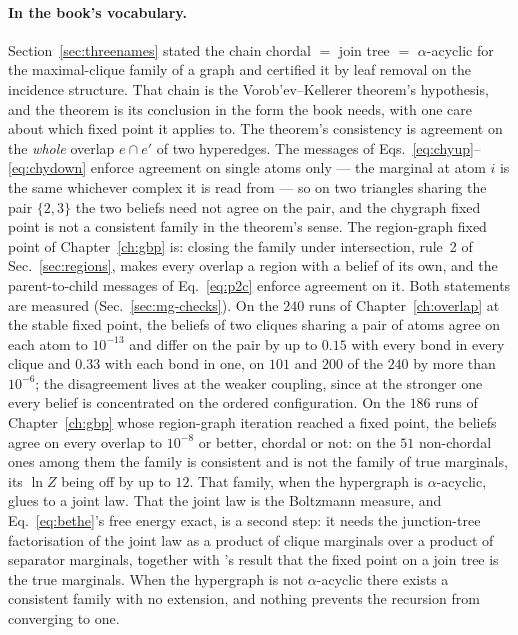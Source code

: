 \paragraph{In the book's vocabulary.} Section~\ref{sec:threenames} stated
the chain chordal $=$ join tree $=$ $\alpha$-acyclic for the maximal-clique
family of a graph and certified it by leaf removal on the incidence
structure. That chain is the Vorob'ev--Kellerer theorem's hypothesis, and
the theorem is its conclusion in the form the book needs, with one care
about which fixed point it applies to. The theorem's consistency is
agreement on the \emph{whole} overlap $e\cap e'$ of two hyperedges. The
messages of Eqs.~\eqref{eq:chyup}--\eqref{eq:chydown} enforce agreement on
single atoms only --- the marginal at atom $i$ is the same whichever
complex it is read from --- so on two triangles sharing the pair
$\{2,3\}$ the two beliefs need not agree on the pair, and the chygraph
fixed point is not a consistent family in the theorem's sense. The
region-graph fixed point of Chapter~\ref{ch:gbp} is: closing the family
under intersection, rule~2 of Sec.~\ref{sec:regions}, makes every overlap a
region with a belief of its own, and the parent-to-child messages of
Eq.~\eqref{eq:p2c} enforce agreement on it. Both statements are measured
(Sec.~\ref{sec:mg-checks}). On the $240$ runs of Chapter~\ref{ch:overlap}
at the stable fixed point, the beliefs of two cliques sharing a pair of
atoms agree on each atom to $10^{-13}$ and differ on the pair by up to
$0.15$ with every bond in every clique and $0.33$ with each bond in one,
on $101$ and $200$ of the $240$ by more than $10^{-6}$; the disagreement
lives at the weaker coupling, since at the stronger one every belief is
concentrated on the ordered configuration. On the $186$ runs of
Chapter~\ref{ch:gbp} whose region-graph iteration reached a fixed point,
the beliefs agree on every overlap to $10^{-8}$ or better, chordal or not:
on the $51$ non-chordal ones among them the family is consistent and is
not the family of true marginals, its $\ln Z$ being off by up to $12$. That family, when the
hypergraph is $\alpha$-acyclic, glues to a joint law. That the joint law is
the Boltzmann measure, and Eq.~\eqref{eq:bethe}'s free energy exact, is a
second step: it needs the junction-tree factorisation of the joint law as
a product of clique marginals over a product of separator marginals,
together with \citeauthor{lauritzen1988}'s result that the fixed point on a
join tree is the true marginals. When the hypergraph is not
$\alpha$-acyclic there exists a consistent family with no extension, and
nothing prevents the recursion from converging to one.

